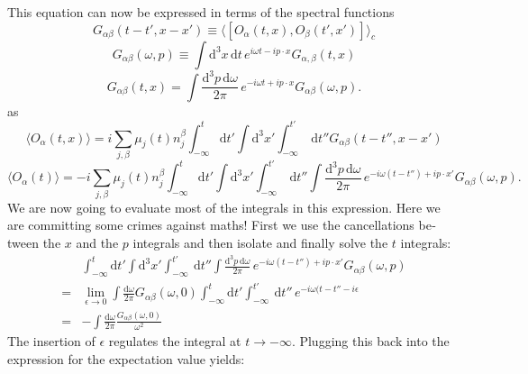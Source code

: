 \documentclass[master,       %
               twoside,        %
               BCOR10mm,       %
               english,ngerman, %
               ]{GAUBM}
\begin{document}
\begin{otherlanguage}{english}
\begin{equation}
\end{equation}
This equation can now be expressed in terms of the spectral functions
\begin{equation}
	G_{\alpha \beta}(t - t', x - x') \equiv \langle [ O_\alpha(t, x), O_\beta(t', x')] \rangle_{c}
\end{equation}
\begin{equation}G_{\alpha \beta}(\omega, p) \equiv \int \mathrm{d}^3 x \, \mathrm{d} t \, e^{i \omega t - i p \cdot x} G_{\alpha, \beta}(t, x)
\end{equation}
\begin{equation}G_{\alpha \beta}(t, x) = \int \frac{\mathrm{d}^3 p \, \mathrm{d} \omega}{2 \pi} \, e^{- i \omega t + i p \cdot x} G_{\alpha \beta}(\omega, p).
\end{equation}
as
\begin{equation}
	\langle O_\alpha(t, x) \rangle = i \sum_{j, \beta} \mu_j(t) n^\beta_j  \int_{-\infty}^t \mathrm{d} t' \int \mathrm{d}^3 x' \int^{t'}_{-\infty} \ \mathrm{d} t'' G_{\alpha \beta}(t - t'', x - x')
\end{equation}
\begin{equation}
	\langle O_\alpha(t) \rangle = - i \sum_{j, \beta} \mu_j(t) n^\beta_j  \int_{-\infty}^t \mathrm{d} t' \int \mathrm{d}^3 x' \int^{t'}_{-\infty} \ \mathrm{d} t''
	\int \frac{\mathrm{d}^3 p \, \mathrm{d} \omega}{2 \pi} \, e^{- i \omega (t - t'') + i p \cdot x'} G_{\alpha \beta}(\omega, p).
\end{equation}
We are now going to evaluate most of the integrals in this expression. Here we are committing some crimes against maths! First we use the cancellations between the $x$ and the $p$ integrals and then isolate and finally solve the $t$ integrals:
\begin{align}
	& \int_{-\infty}^t \mathrm{d} t' \int \mathrm{d}^3 x' \int^{t'}_{-\infty} \ \mathrm{d} t''
	\int \frac{\mathrm{d}^3 p \, \mathrm{d} \omega}{2 \pi} \, e^{- i \omega (t - t'') + i p \cdot x'} G_{\alpha \beta}(\omega, p) \nonumber \\
	= & \lim_{\epsilon \to 0} \int \frac{\mathrm{d} \omega}{2 \pi} G_{\alpha \beta}(\omega, 0) \int_{-\infty}^t \mathrm{d} t' \int^{t'}_{-\infty} \ \mathrm{d} t''
	\, e^{- i \omega (t - t'' - i \epsilon}  \nonumber \\
	= & - \int \frac{\mathrm{d} \omega}{2 \pi} \frac{G_{\alpha \beta}(\omega, 0)} {\omega^2}
\end{align}
The insertion of $\epsilon$ regulates the integral at $t \to - \infty$.
Plugging this back into the expression for the expectation value yields:

\end{otherlanguage}
\end{document}

